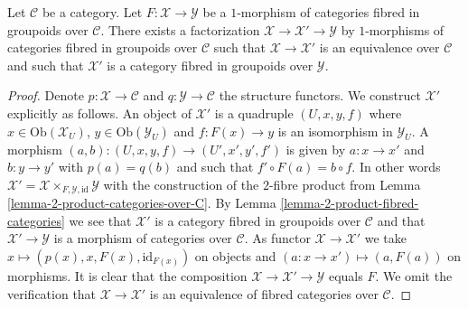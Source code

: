 \begin{lemma}
\label{lemma-ameliorate-morphism-categories-fibred-groupoids}
Let $\mathcal{C}$ be a category. Let $F : \mathcal{X} \to \mathcal{Y}$
be a $1$-morphism of categories fibred in groupoids over $\mathcal{C}$.
There exists a factorization $\mathcal{X} \to \mathcal{X}' \to \mathcal{Y}$
by $1$-morphisms of categories fibred in groupoids over $\mathcal{C}$ such
that $\mathcal{X} \to \mathcal{X}'$ is an equivalence over $\mathcal{C}$
and such that $\mathcal{X}'$ is a category fibred in groupoids over
$\mathcal{Y}$.
\end{lemma}

\begin{proof}
Denote $p : \mathcal{X} \to \mathcal{C}$ and $q : \mathcal{Y} \to \mathcal{C}$
the structure functors. We construct $\mathcal{X}'$ explicitly as follows.
An object of $\mathcal{X}'$ is a quadruple $(U, x, y, f)$ where
$x \in \text{Ob}(\mathcal{X}_U)$, $y \in \text{Ob}(\mathcal{Y}_U)$
and $f : F(x) \to y$ is an isomorphism in $\mathcal{Y}_U$.
A morphism $(a, b) : (U, x, y, f) \to (U', x', y', f')$ is given
by $a : x \to x'$ and $b : y \to y'$ with $p(a) = q(b)$ and
such that $f' \circ F(a) = b \circ f$. In other words
$\mathcal{X}' = \mathcal{X} \times_{F, \mathcal{Y}, \text{id}} \mathcal{Y}$
with the construction of the $2$-fibre product from
Lemma \ref{lemma-2-product-categories-over-C}.
By
Lemma \ref{lemma-2-product-fibred-categories}
we see that $\mathcal{X}'$ is a category fibred in groupoids over
$\mathcal{C}$ and that $\mathcal{X}' \to \mathcal{Y}$ is a morphism of
categories over $\mathcal{C}$. As functor $\mathcal{X} \to \mathcal{X}'$ we take
$x \mapsto (p(x), x, F(x), \text{id}_{F(x)})$ on objects and
$(a : x \to x') \mapsto (a, F(a))$ on morphisms. It is clear that
the composition $\mathcal{X} \to \mathcal{X}' \to \mathcal{Y}$
equals $F$. We omit the verification that
$\mathcal{X} \to \mathcal{X}'$ is an equivalence of fibred categories over
$\mathcal{C}$.


\end{proof}
